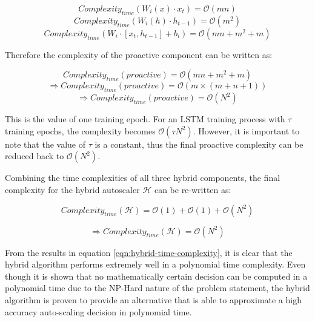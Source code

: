 \[Complexity_{time}(W_{i}(x) \cdot x_{t}) = \mathcal{O}(mn)\]
\[Complexity_{time}(W_{i}(h) \cdot h_{t-1}) = \mathcal{O}(m^2)\]
\begin{equation}
    Complexity_{time}(W_{i} \cdot [x_{t}, h_{t-1}] + b_{i}) = \mathcal{O}(mn + m^2 + m)
\end{equation}

Therefore the complexity of the proactive component can be written as:

\[Complexity_{time}(proactive) = \mathcal{O}(mn + m^2 + m)\]
\[\Rightarrow Complexity_{time}(proactive) = \mathcal{O}(m \times (m + n + 1))\]
\begin{equation}
    \Rightarrow Complexity_{time}(proactive) = \mathcal{O}(N^2)
\end{equation}

This is the value of one training epoch. For an LSTM training process with $\tau$ training epochs, the complexity becomes $\mathcal{O}(\tau N^2)$. However, it is important to note that the value of $\tau$ is a constant, thus the final proactive complexity can be reduced back to $\mathcal{O}(N^2)$.\par

Combining the time complexities of all three hybrid components, the final complexity for the hybrid autoscaler $\mathcal{H}$ can be re-written as:

\[Complexity_{time}(\mathcal{H}) = \mathcal{O}(1) +  \mathcal{O}(1) + \mathcal{O}(N^2)\]

\begin{equation}
    \label{eqn:hybrid-time-complexity}
    \Rightarrow Complexity_{time}(\mathcal{H}) = \mathcal{O}(N^2)
\end{equation}

From the results in equation \ref{eqn:hybrid-time-complexity}, it is clear that the hybrid algorithm performs extremely well in a polynomial time complexity. Even though it is shown that no mathematically certain decision can be computed in a polynomial time due to the NP-Hard nature of the problem statement, the hybrid algorithm is proven to provide an alternative that is able to approximate a high accuracy auto-scaling decision in polynomial time.